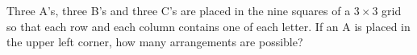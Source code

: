 Three A's, three B's and three C's are placed in the nine squares of a $3\times3$ grid so that each row and each column contains one of each letter. If an A is placed in the upper left corner, how many arrangements are possible?
